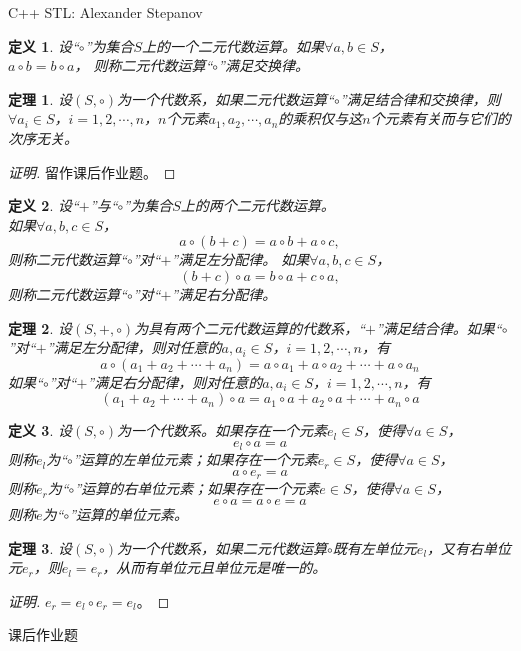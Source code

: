 \documentclass{article}
\newtheorem{Def}{定义}
\newtheorem{Thm}{定理}
\begin{document}
\begin{CJK*}{UTF8}{gbsn}
C++ STL: Alexander Stepanov
 \begin{Def}
    设“$\circ$”为集合$S$上的一个二元代数运算。如果$\forall a, b \in S$，\\$a \circ b = b \circ a$， 则称二元代数运算“$\circ$”满足交换律。
  \end{Def}
  \begin{Thm}
    设$(S,\circ)$为一个代数系，如果二元代数运算“$\circ$”满足结合律和交换律，则$\forall a_i\in S$，$i=1,2,\cdots,n$，$n$个元素$a_1,a_2,\cdots,a_n$的乘积仅与这$n$个元素有关而与它们的次序无关。
  \end{Thm}
  \begin{proof}[证明]
留作课后作业题。    
  \end{proof}
  \begin{Def}
    设“$+$”与“$\circ$”为集合$S$上的两个二元代数运算。\\如果$\forall a, b, c \in S$，\[a \circ (b + c) = a \circ b + a \circ c,\] 则称二元代数运算“$\circ$”对“$+$”满足左分配律。
    如果$\forall a, b, c \in S$，\[(b + c)\circ a = b \circ a + c \circ a,\] 则称二元代数运算“$\circ$”对“$+$”满足右分配律。
  \end{Def}
  \begin{Thm}
    设$(S,+,\circ)$为具有两个二元代数运算的代数系，“$+$”满足结合律。如果“$\circ$”对“$+$”满足左分配律，则对任意的$a,a_i\in S$，$i=1,2,\cdots,n$，有
    \[a\circ (a_1+a_2+\cdots+a_n) = a\circ a_1 + a\circ a_2 + \cdots + a\circ a_n\]
    如果“$\circ$”对“$+$”满足右分配律，则对任意的$a,a_i\in S$，$i=1,2,\cdots,n$，有
    \[(a_1+a_2+\cdots+a_n)\circ a  = a_1\circ a + a_2\circ a + \cdots + a_n\circ a\]
  \end{Thm}
  \begin{Def}
    设$(S,\circ)$为一个代数系。如果存在一个元素$e_l\in S$，使得$\forall a\in S$，
    \[e_l\circ a = a\]
    则称$e_l$为“$\circ$”运算的左单位元素；如果存在一个元素$e_r\in S$，使得$\forall a\in S$，
    \[a\circ e_r = a\]
    则称$e_r$为“$\circ$”运算的右单位元素；如果存在一个元素$e\in S$，使得$\forall a\in S$，
    \[e\circ a = a\circ e = a\]
    则称$e$为“$\circ$”运算的单位元素。
  \end{Def}
  \begin{Thm}
    设$(S,\circ)$为一个代数系，如果二元代数运算$\circ$既有左单位元$e_l$，又有右单位元$e_r$，则$e_l=e_r$，从而有单位元且单位元是唯一的。
  \end{Thm}
  \begin{proof}[证明]
    $e_r = e_l\circ e_r = e_l$。
  \end{proof}
  课后作业题


\end{CJK*}
\end{document}

